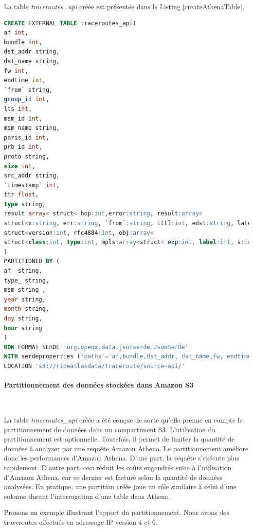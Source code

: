 La table \textit{traceroutes\_api}  créée est présentée dans le Listing \ref{createAthenaTable}.
\begin{lstlisting}[language=SQL, basicstyle=\footnotesize, label=createAthenaTable, caption={Création de la table des traceroutes dans Amazon Athena }]
CREATE EXTERNAL TABLE traceroutes_api(
af int,
bundle int,
dst_addr string,
dst_name string,
fw int,
endtime int,
`from` string,
group_id int,
lts int,
msm_id int,
msm_name string,
paris_id int,
prb_id int,
proto string,
size int,
src_addr string,
`timestamp` int,
ttr float,
type string,
result array< struct< hop:int,error:string, result:array<
struct<x:string, err:string, `from`:string, ittl:int, edst:string, late:int, mtu:int, rtt:float, size:int, ttl:int , flags:string, dstoptsize:int, hbhoptsize:int, icmpext:
struct<version:int, rfc4884:int, obj:array< 
struct<class:int, type:int, mpls:array<struct< exp:int, label:int, s:int, ttl:int>>>>>>>>> 
)
PARTITIONED BY (
af_ string,
type_ string,
msm string ,
year string,
month string,
day string,
hour string
) 
ROW FORMAT SERDE 'org.openx.data.jsonserde.JsonSerDe'
WITH serdeproperties ('paths'='af,bundle,dst_addr, dst_name,fw, endtime, from, lts, msm_id, paris_id, prb_id, proto, size, src_addr, timestamp, type,fw, msm_name' ) 
LOCATION 's3://ripeatlasdata/traceroute/source=api/'
\end{lstlisting}





\paragraph{Partitionnement des données stockées dans Amazon S3}~

La table \textit{traceroutes\_api} créée a été conçue de sorte qu'elle prenne en compte  le partitionnement de données dans un compartiment S3.  L'utilisation du partitionnement est optionnelle. Toutefois, il permet de limiter la quantité de données à analyser par une requête Amazon Athena. Le partitionnement améliore donc les performances d'Amazon Athena. D'une part, la requête s'exécute plus rapidement. D'autre part, ceci réduit les coûts engendrés  suite à l'utilisation d'Amazon Athena, car ce dernier est facturé selon la quantité de données analysées. En pratique,  une partition créée joue un rôle similaire à celui d'une colonne durant l'interrogation d'une table dans Athena. 

Prenons un exemple illustrant l'apport du partitionnement. Nous avons des traceroutes effectués en adressage IP  version  $ 4 $ et $ 6 $.


